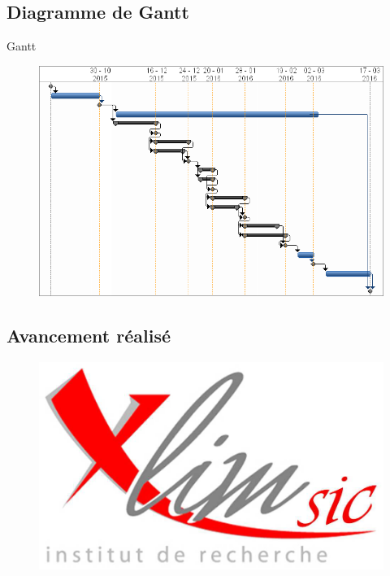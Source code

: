 \documentclass{beamer}
\begin{document}
	\subsection{Diagramme de Gantt}
	\begin{frame}{Gantt}
		\begin{figure}
			\includegraphics[height=7.5cm]{../Images/Gantt_Macro2.png}
		\end{figure}
	\end{frame}


	\subsection{Avancement réalisé}
	\begin{frame}{\subsecname}
		\begin{figure}
			\includegraphics[width=12cm]{../Images/logo-Xlim.png} %
		\end{figure}
	\end{frame}
\end{document}
